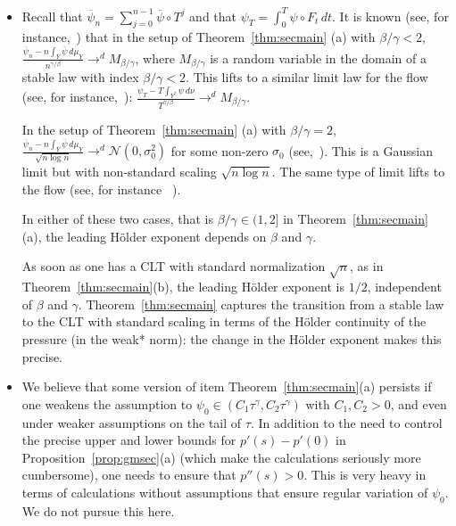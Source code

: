 \documentclass[12pt]{article}
\numberwithin{equation}{section}
\newcommand{\F}{F}
\begin{document}
 \begin{rmk}\label{rmk:st}
 \begin{itemize}
\item[(a)] Recall that $\overline\psi_n=\sum_{j=0}^{n-1}\overline\psi\circ T^j$
and that 
$\psi_T=\int_0^T\psi\circ \F_t\, dt$. It is known (see, for instance,~\cite[Theorem 2]{Sar06}) that in the setup of Theorem~\ref{thm:secmain} (a) with $\beta/\gamma<2$, $\frac{\overline\psi_n-n\int_{Y}\overline\psi\, d\mu_Y}{n^{\gamma/\beta}}\to^d M_{\beta/\gamma}$, where $M_{\beta/\gamma}$ is a random variable in the domain of a stable law with index
  $\beta/\gamma<2$. This lifts to a similar limit law for the flow (see, for instance,~\cite[Lemma 6.3]{BruTerTod21}): $\frac{\psi_T-T\int_{Y^\tau}\psi\, d\nu}{T^{\gamma/\beta}}\to^d M_{\beta/\gamma}$.
  
  In the setup of Theorem~\ref{thm:secmain} (a)  with $\beta/\gamma=2$, $\frac{\overline\psi_n-n\int_{Y}\overline\psi\, d\mu_Y}{\sqrt{n\log n}}\to^d \mathcal N(0,\sigma_0^2)$ for some non-zero $\sigma_0$ (see,~\cite[Theorem 3]{Sar06}).
  This is a Gaussian limit but with non-standard scaling $\sqrt{n\log n}$.
  The same type of limit lifts to the flow (see, for instance ~\cite[Lemma 6.3]{BruTerTod21}).
  
  In either of these two cases, that is $\beta/\gamma\in (1,2]$ in Theorem~\ref{thm:secmain} (a), the leading H{\"o}lder exponent depends on $\beta$ and $\gamma$.
  
  
  As soon as one has a CLT with standard normalization $\sqrt{n}$, as in  Theorem~\ref{thm:secmain}(b), the leading H{\"o}lder exponent is $1/2$, independent of $\beta$ and $\gamma$.
  Theorem~\ref{thm:secmain}  captures the transition from a stable law to the CLT with standard scaling in terms of the H{\"o}lder continuity of the pressure (in the weak* norm): the change in the H{\"o}lder exponent makes this precise.
  
 \item[(b)] We believe that some version of item Theorem~\ref{thm:secmain}(a) persists if one weakens the assumption to $\psi_0\in (C_1 \tau^\gamma, C_2\tau^\gamma)$ 
 with $C_1, C_2 >0$, 
  and even under weaker assumptions on the tail of $\tau$.
  In addition to the need to control the precise upper and lower bounds for $p'(s)-p'(0)$ in Proposition~\ref{prop:gmsec}(a)
  (which make the calculations seriously more cumbersome), one needs to ensure that $p''(s)>0$. This is very heavy in terms
  of calculations without assumptions that ensure regular variation of  $\psi_0$.  
   We do not pursue this here.
   \end{itemize}
  \end{rmk}
  
\end{document}
